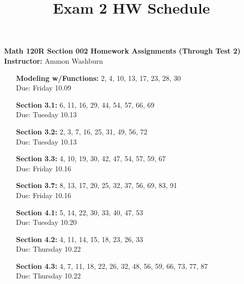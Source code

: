\documentclass[fleqn]{article}
\title{Exam 2 HW Schedule}
\begin{document}
{\centering
{\bf Math 120R Section 002 Homework Assignments (Through Test 2)} \\[10px]
{\bf Instructor: } Ammon Washburn \\[20px]
}

\begin{enumerate}
\item[\bf Modeling w/Functions:] 2, 4, 10, 13, 17, 23, 28, 30 \\
{\color{blue} Due: Friday 10.09}

\item[\bf Section 3.1:] 6, 11, 16, 29, 44, 54, 57, 66, 69 \\
{\color{blue} Due: Tuesday 10.13}

\item[\bf Section 3.2:] 2, 3, 7, 16, 25, 31, 49, 56, 72 \\
{\color{blue} Due: Tuesday 10.13}

\item[\bf Section 3.3:] 4, 10, 19, 30, 42, 47, 54, 57, 59, 67 \\
{\color{blue} Due: Friday 10.16}

\item[\bf Section 3.7:] 8, 13, 17, 20, 25, 32, 37, 56, 69, 83, 91 \\
{\color{blue} Due: Friday 10.16}

\item[\bf Section 4.1:] 5, 14, 22, 30, 33, 40, 47, 53 \\
{\color{blue} Due: Tuesday 10.20}

\item[\bf Section 4.2:] 4, 11, 14, 15, 18, 23, 26, 33 \\
{\color{blue} Due: Thursday 10.22}

\item[\bf Section 4.3:] 4, 7, 11, 18, 22, 26, 32, 48, 56, 59, 66, 73, 77, 87 \\
{\color{blue} Due: Thursday 10.22}

\end{enumerate}
\end{document}
